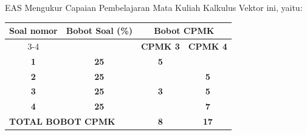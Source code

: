 \documentclass[11pt,letterpaper]{article}
\begin{document}
\noindent EAS Mengukur Capaian Pembelajaran Mata Kuliah Kalkulus Vektor ini, yaitu:
\begin{center}
    \begin{tabular}{|c|c|c|c|}
        \hline
        \multirow{2}{*}{\textbf{Soal nomor}}            & \multirow{2}{*}{\textbf{Bobot Soal (\%)}} & \multicolumn{2}{c|}{\textbf{Bobot CPMK}}                   \\ \cline{3-4}
                                                        &                                           & \textbf{CPMK 3}                          & \textbf{CPMK 4} \\ \hline
        \textbf{1}                                      & \textbf{25}                               & \textbf{5}                               &                 \\ \hline
        \textbf{2}                                      & \textbf{25}                               &                                          & \textbf{5}      \\ \hline
        \textbf{3}                                      & \textbf{25}                               & \textbf{3}                               & \textbf{5}      \\ \hline
        \textbf{4}                                      & \textbf{25}                               &                                          & \textbf{7}      \\ \hline
        \multicolumn{2}{|l|}{\textbf{TOTAL BOBOT CPMK}} & \textbf{8}                                & \textbf{17}                                                \\ \hline
    \end{tabular}
\end{center}
\end{document}
